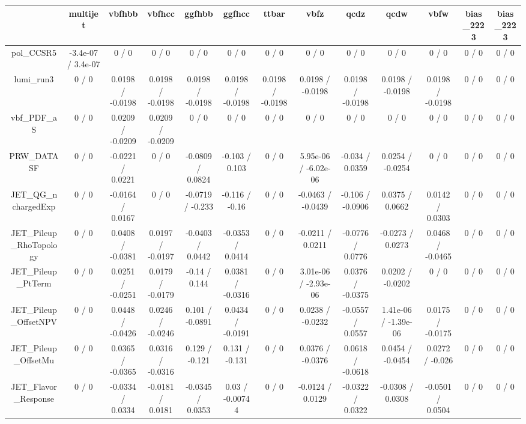 \documentclass[10pt]{article}
\begin{document}
\begin{table}[htbp]
\begin{center}
\begin{tabular}{|c|c|c|c|c|c|c|c|c|c|c|c|c|}
\hline 
      & multijet      & vbfhbb      & vbfhcc      & ggfhbb      & ggfhcc      & ttbar      & vbfz      & qcdz      & qcdw      & vbfw      & bias_2223      & bias_2223 \\ 
\hline 
  pol_CCSR5 & -3.4e-07 / 3.4e-07 & 0 / 0 & 0 / 0 & 0 / 0 & 0 / 0 & 0 / 0 & 0 / 0 & 0 / 0 & 0 / 0 & 0 / 0 & 0 / 0 & 0 / 0 \\ 
  lumi_run3 & 0 / 0 & 0.0198 / -0.0198 & 0.0198 / -0.0198 & 0.0198 / -0.0198 & 0.0198 / -0.0198 & 0.0198 / -0.0198 & 0.0198 / -0.0198 & 0.0198 / -0.0198 & 0.0198 / -0.0198 & 0.0198 / -0.0198 & 0 / 0 & 0 / 0 \\ 
  vbf_PDF_aS & 0 / 0 & 0.0209 / -0.0209 & 0.0209 / -0.0209 & 0 / 0 & 0 / 0 & 0 / 0 & 0 / 0 & 0 / 0 & 0 / 0 & 0 / 0 & 0 / 0 & 0 / 0 \\ 
  PRW_DATASF & 0 / 0 & -0.0221 / 0.0221 & 0 / 0 & -0.0809 / 0.0824 & -0.103 / 0.103 & 0 / 0 & 5.95e-06 / -6.02e-06 & -0.034 / 0.0359 & 0.0254 / -0.0254 & 0 / 0 & 0 / 0 & 0 / 0 \\ 
  JET_QG_nchargedExp & 0 / 0 & -0.0164 / 0.0167 & 0 / 0 & -0.0719 / -0.233 & -0.116 / -0.16 & 0 / 0 & -0.0463 / -0.0439 & -0.106 / -0.0906 & 0.0375 / 0.0662 & 0.0142 / 0.0303 & 0 / 0 & 0 / 0 \\ 
  JET_Pileup_RhoTopology & 0 / 0 & 0.0408 / -0.0381 & 0.0197 / -0.0197 & -0.0403 / 0.0442 & -0.0353 / 0.0414 & 0 / 0 & -0.0211 / 0.0211 & -0.0776 / 0.0776 & -0.0273 / 0.0273 & 0.0468 / -0.0465 & 0 / 0 & 0 / 0 \\ 
  JET_Pileup_PtTerm & 0 / 0 & 0.0251 / -0.0251 & 0.0179 / -0.0179 & -0.14 / 0.144 & 0.0381 / -0.0316 & 0 / 0 & 3.01e-06 / -2.93e-06 & 0.0376 / -0.0375 & 0.0202 / -0.0202 & 0 / 0 & 0 / 0 & 0 / 0 \\ 
  JET_Pileup_OffsetNPV & 0 / 0 & 0.0448 / -0.0426 & 0.0246 / -0.0246 & 0.101 / -0.0891 & 0.0434 / -0.0191 & 0 / 0 & 0.0238 / -0.0232 & -0.0557 / 0.0557 & 1.41e-06 / -1.39e-06 & 0.0175 / -0.0175 & 0 / 0 & 0 / 0 \\ 
  JET_Pileup_OffsetMu & 0 / 0 & 0.0365 / -0.0365 & 0.0316 / -0.0316 & 0.129 / -0.121 & 0.131 / -0.131 & 0 / 0 & 0.0376 / -0.0376 & 0.0618 / -0.0618 & 0.0454 / -0.0454 & 0.0272 / -0.026 & 0 / 0 & 0 / 0 \\ 
  JET_Flavor_Response & 0 / 0 & -0.0334 / 0.0334 & -0.0181 / 0.0181 & -0.0345 / 0.0353 & 0.03 / -0.00744 & 0 / 0 & -0.0124 / 0.0129 & -0.0322 / 0.0322 & -0.0308 / 0.0308 & -0.0501 / 0.0504 & 0 / 0 & 0 / 0 \\ 

\end{tabular}
\end{center}
\end{table}
\end{document}
